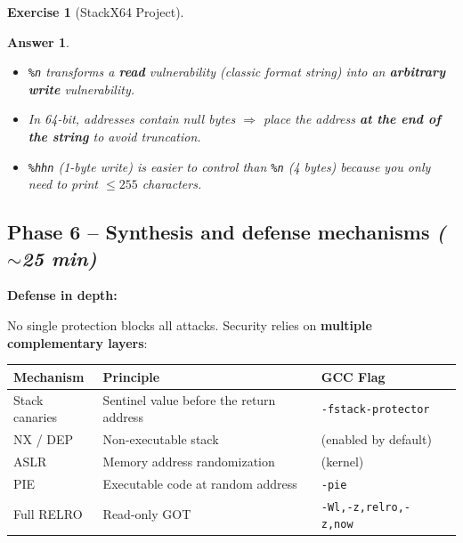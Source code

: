 \documentclass[a4paper,11pt]{article}
\theoremstyle{plain}
\newtheorem{correction}{Answer}
\theoremstyle{definition}
\newtheorem{exercice}{Exercise}
\begin{document}
\begin{exercice}[StackX64 Project]
\begin{correction}
\begin{pointcle}
\begin{itemize}
    \item \texttt{\%n} transforms a \textbf{read} vulnerability (classic format string) into an \textbf{arbitrary write} vulnerability.
    \item In 64-bit, addresses contain null bytes $\Rightarrow$ place the address \textbf{at the end of the string} to avoid truncation.
    \item \texttt{\%hhn} (1-byte write) is easier to control than \texttt{\%n} (4 bytes) because you only need to print $\leq 255$ characters.
\end{itemize}
\end{pointcle}

\end{correction}



\subsection*{Phase 6 -- Synthesis and defense mechanisms \hfill\normalfont\textit{($\sim$25 min)}}

\begin{rappel}
\textbf{Defense in depth:}

No single protection blocks all attacks. Security relies on \textbf{multiple complementary layers}:

\begin{center}
\begin{tabular}{llll}
\toprule
\textbf{Mechanism} & \textbf{Principle} & \textbf{GCC Flag} \\
\midrule
Stack canaries & Sentinel value before the return address & \texttt{-fstack-protector} \\
NX / DEP & Non-executable stack & (enabled by default) \\
ASLR & Memory address randomization & (kernel) \\
PIE & Executable code at random address & \texttt{-pie} \\
Full RELRO & Read-only GOT & \texttt{-Wl,-z,relro,-z,now} \\
\bottomrule
\end{tabular}
\end{center}
\end{rappel}


\end{exercice}
\end{document}
